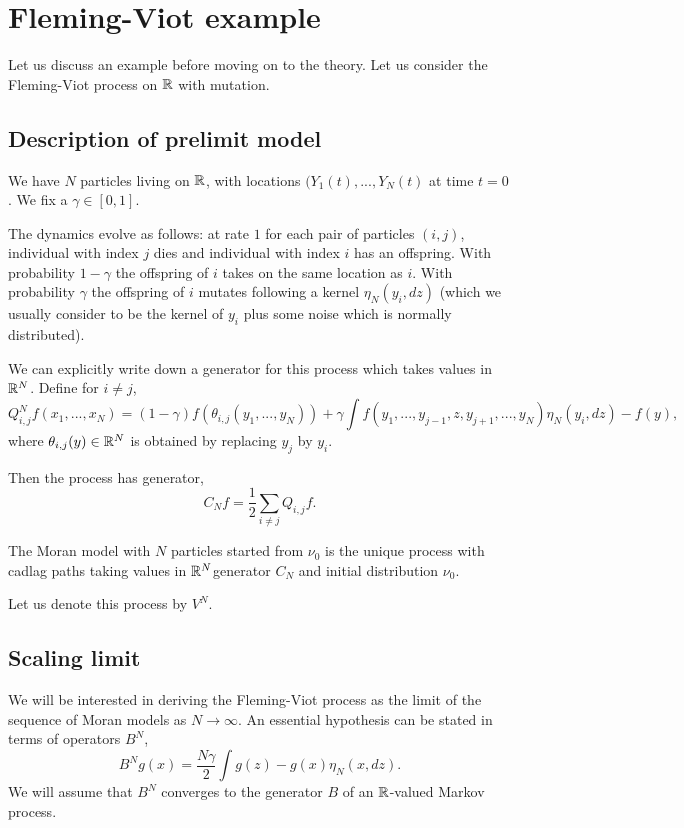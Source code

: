 \documentclass{article}
\begin{document}
\section{Fleming-Viot example}

Let us discuss an example before moving on to the theory. Let us consider the Fleming-Viot process on $\mathbb{R}$ with mutation. 

\subsection{Description of prelimit model}
We have $N$ particles living on $\mathbb{R}$, with locations $(Y_1(t),...,Y_N(t)$ at time $t=0$. We fix a $\gamma\in[0,1]$.

The dynamics evolve as follows: at rate $1$ for each pair of particles $(i,j)$, individual with index $j$ dies 
and individual with index $i$ has an offspring.
With probability $1-\gamma$ the offspring of $i$ takes on the same location as $i$.
With probability $\gamma$ the offspring of $i$ mutates following a kernel $\eta_N(y_i,dz)$ (which we usually consider to be the kernel of $y_i$
plus some noise which is normally distributed).

We can explicitly write down a generator for this process which takes values in $\mathbb{R}^N$. 
Define for $i\neq j$,
    $$Q_{i,j}^Nf(x_1,...,x_N)=(1-\gamma)f(\theta_{i,j}(y_1,...,y_N))+\gamma\int f(y_1,...,y_{j-1},z,y_{j+1},...,y_N)\eta_N(y_i,dz)-f(y),$$
where $\theta_{i,j}(y)\in\mathbb{R}^N$ is obtained by replacing $y_j$ by $y_i$.

Then the process has generator,
\begin{equation*}
    C_Nf=\frac{1}{2}\sum_{i\neq j}Q_{i,j}f.
\end{equation*}
\begin{dfn}
    The Moran model with $N$ particles started from $\nu_0$ is the unique process with cadlag paths taking values in $\mathbb{R}^N$generator $C_N$ and initial distribution $\nu_0$. 
\end{dfn}
Let us denote this process by $V^N$.

\subsection{Scaling limit}
We will be interested in deriving the Fleming-Viot process as the limit of the sequence of Moran models as $N\rightarrow\infty$.
An essential hypothesis can be stated in terms of operators $B^N$,
\begin{equation*}
    B^Ng(x)=\frac{N\gamma}{2}\int g(z)-g(x)\eta_N(x,dz).
\end{equation*}
We will assume that $B^N$ converges to the generator $B$ of an $\mathbb{R}$-valued Markov process.
\end{document}
